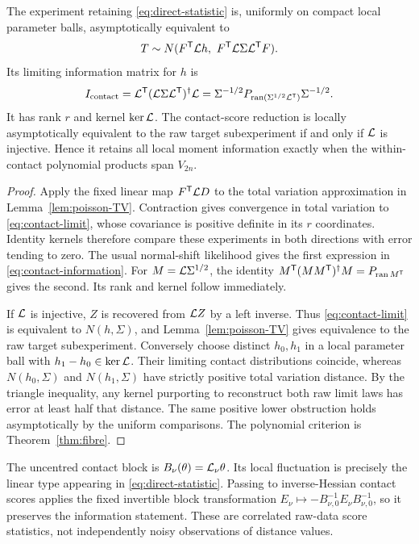 \begin{theorem}\label{thm:contact-experiment}
The experiment retaining \eqref{eq:direct-statistic} is, uniformly on compact local parameter balls, asymptotically equivalent to
\begin{equation}\label{eq:contact-limit}
 T\sim N(F^{\mathsf T}\mathcal L h,\ F^{\mathsf T}\mathcal L\Sigma\mathcal L^{\mathsf T}F).
\end{equation}
Its limiting information matrix for $h$ is
\begin{equation}\label{eq:contact-information}
 I_{\rm contact}=\mathcal L^{\mathsf T}(\mathcal L\Sigma\mathcal L^{\mathsf T})^\dagger\mathcal L
 =\Sigma^{-1/2}P_{\operatorname{ran}(\Sigma^{1/2}\mathcal L^{\mathsf T})}\Sigma^{-1/2}.
\end{equation}
It has rank $r$ and kernel $\ker\mathcal L$. The contact-score reduction is locally asymptotically equivalent to the raw target subexperiment if and only if $\mathcal L$ is injective. Hence it retains all local moment information exactly when the within-contact polynomial products span $V_{2n}$.
\end{theorem}
\begin{proof}
Apply the fixed linear map $F^{\mathsf T}\mathcal L D$ to the total variation approximation in Lemma~\ref{lem:poisson-TV}. Contraction gives convergence in total variation to \eqref{eq:contact-limit}, whose covariance is positive definite in its $r$ coordinates. Identity kernels therefore compare these experiments in both directions with error tending to zero. The usual normal-shift likelihood gives the first expression in \eqref{eq:contact-information}. For $M=\mathcal L\Sigma^{1/2}$, the identity $M^{\mathsf T}(MM^{\mathsf T})^\dagger M=P_{\operatorname{ran} M^{\mathsf T}}$ gives the second. Its rank and kernel follow immediately.

If $\mathcal L$ is injective, $Z$ is recovered from $\mathcal L Z$ by a left inverse. Thus \eqref{eq:contact-limit} is equivalent to $N(h,\Sigma)$, and Lemma~\ref{lem:poisson-TV} gives equivalence to the raw target subexperiment. Conversely choose distinct $h_0,h_1$ in a local parameter ball with $h_1-h_0\in\ker\mathcal L$. Their limiting contact distributions coincide, whereas $N(h_0,\Sigma)$ and $N(h_1,\Sigma)$ have strictly positive total variation distance. By the triangle inequality, any kernel purporting to reconstruct both raw limit laws has error at least half that distance. The same positive lower obstruction holds asymptotically by the uniform comparisons. The polynomial criterion is Theorem~\ref{thm:fibre}.
\end{proof}
The uncentred contact block is $B_\nu(\theta)=\mathcal L_\nu\theta$. Its local fluctuation is precisely the linear type appearing in \eqref{eq:direct-statistic}. Passing to inverse-Hessian contact scores applies the fixed invertible block transformation $E_\nu\mapsto-B_{\nu,0}^{-1}E_\nu B_{\nu,0}^{-1}$, so it preserves the information statement. These are correlated raw-data score statistics, not independently noisy observations of distance values.

